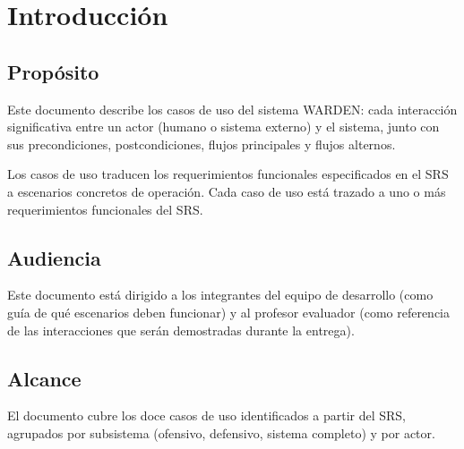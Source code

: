 \documentclass[11pt,a4paper]{article}
\begin{document}

\begin{wardenrevisions}
\end{wardenrevisions}

\tableofcontents
\newpage

\section{Introducción}

\subsection{Propósito}
Este documento describe los casos de uso del sistema WARDEN: cada
interacción significativa entre un actor (humano o sistema externo) y el
sistema, junto con sus precondiciones, postcondiciones, flujos principales
y flujos alternos.

Los casos de uso traducen los requerimientos funcionales especificados en
el SRS a escenarios concretos de operación. Cada caso de uso está trazado
a uno o más requerimientos funcionales del SRS.

\subsection{Audiencia}
Este documento está dirigido a los integrantes del equipo de desarrollo
(como guía de qué escenarios deben funcionar) y al profesor evaluador
(como referencia de las interacciones que serán demostradas durante la
entrega).

\subsection{Alcance}
El documento cubre los doce casos de uso identificados a partir del SRS,
agrupados por subsistema (ofensivo, defensivo, sistema completo) y por
actor.
\end{document}
